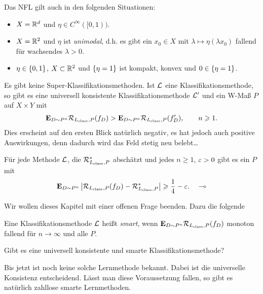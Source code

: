 \begin{bem*}[Abschlussbemerkungen.]
\begin{bemenum}
\item Das NFL gilt auch in den folgenden Situationen:
\begin{itemize}
  \item $X=\mathbb{R}^d$ und $\eta\in C^\infty([0,1))$.
  \item $X=\mathbb{R}^2$ und $\eta$ ist \emph{unimodal}, d.h. es gibt ein $x_0\in X$
  mit $\lambda\mapsto \eta(\lambda x_0)$ fallend für wachsendes $\lambda > 0$.
  \item $\eta\in\left\{ 0,1 \right\}$, $X\subset\mathbb{R}^2$ und $\left\{ \eta = 1 \right\}$ ist kompakt,
   konvex und $0\in \left\{ \eta=1 \right\}$.
\end{itemize}
\item Es gibt keine Super-Klassifikationsmethoden. Ist $\mathcal{L}$ eine
Klassifikationsmethode, so gibt es eine universell konsistente
Klassifikationsmethode $\mathcal{L}'$ und ein W-Maß $P$ auf $X\times Y$ mit
\begin{align*}
\textbf{E}_{D\sim P^n} \mathcal{R}_{L_{\mathrm{class}},P}(f_D) > \textbf{E}_{D\sim
P^n}\mathcal{R}_{L_{\mathrm{class}},P}(f_D'),\qquad n\geqslant 1.
\end{align*}
Dies erscheint auf den ersten Blick natürlich negativ, es hat jedoch auch
positive Auswirkungen, denn dadurch wird das Feld stetig neu belebt\ldots
\item Für jede Methode $\mathcal{L}$, die $\mathcal{R}_{L_{\mathrm{class}},P}^*$ abschätzt und jedes
$n\ge 1$, $\varepsilon > 0$ gibt es ein $P$ mit
\begin{align*}
\textbf{E}_{D\sim P^n} \left|\mathcal{R}_{L_{\mathrm{class}},P}(f_D) - \mathcal{R}_{L_{\mathrm{class}},P}^*\right| \geqslant
\frac{1}{4}-\varepsilon.\quad\multimap
\end{align*}
\end{bemenum}
\end{bem*}

Wir wollen dieses Kapitel mit einer offenen Frage beenden. Dazu die folgende

\begin{defn*}
Eine Klassifikationsmethode $\mathcal{L}$ heißt \emph{smart}, wenn
$\textbf{E}_{D\sim P^n} \mathcal{R}_{L_{\mathrm{class}},P}(f_D)$
monoton fallend für $n\to\infty$ und alle $P$.\fishhere
\end{defn*}

\begin{prop*}
Gibt es eine universell konsistente und smarte Klassifikationsmethode?\fishhere
\end{prop*}

Bis jetzt ist noch keine solche Lernmethode bekannt. Dabei ist die universelle
Konsistenz entscheidend. Lässt man diese Voraussetzung fallen, so gibt es
natürlich zahllose smarte Lernmethoden. 
